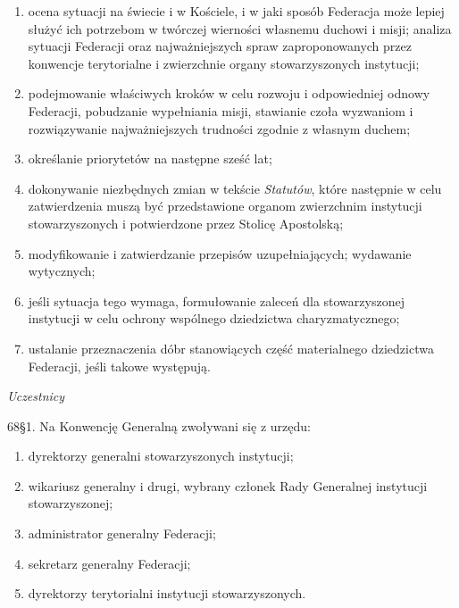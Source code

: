 ﻿\documentclass{book}
\newcommand{\lett}[1]{\lettrine[findent=6pt]{#1}}
\newcommand{\ssec}[1]{\vspace{1em}\textit{#1}\vspace{.5em}\nopagebreak}
\begin{document}
\begin{enumerate}


\item ocena sytuacji na świecie i w Kościele, i w jaki sposób Federacja może lepiej służyć ich potrzebom w twórczej wierności własnemu duchowi i misji; analiza sytuacji Federacji oraz najważniejszych spraw zaproponowanych przez konwencje terytorialne i zwierzchnie organy stowarzyszonych instytucji;


\item podejmowanie właściwych kroków w celu rozwoju i odpowiedniej odnowy Federacji, pobudzanie wypełniania misji, stawianie czoła wyzwaniom i rozwiązywanie najważniejszych trudności zgodnie z własnym duchem;


\item określanie priorytetów na następne sześć lat;


\item dokonywanie niezbędnych zmian w tekście {\em Statutów}, które następnie w celu zatwierdzenia muszą być przedstawione organom zwierzchnim instytucji stowarzyszonych i potwierdzone przez Stolicę Apostolską;


\item modyfikowanie i zatwierdzanie przepisów uzupełniających; wydawanie wytycznych;


\item jeśli sytuacja tego wymaga, formułowanie zaleceń dla stowarzyszonej instytucji  w celu ochrony wspólnego dziedzictwa charyzmatycznego;


\item ustalanie przeznaczenia dóbr stanowiących część materialnego dziedzictwa Federacji, jeśli takowe występują.  


\end{enumerate}


\ssec{Uczestnicy}


\lett{68} \S{}1. Na Konwencję Generalną zwoływani się z urzędu:


\begin{enumerate}


\item dyrektorzy generalni stowarzyszonych instytucji;


\item wikariusz generalny i drugi, wybrany członek Rady Generalnej instytucji stowarzyszonej;


\item administrator generalny Federacji;


\item sekretarz generalny Federacji;


\item dyrektorzy terytorialni instytucji stowarzyszonych.


\end{enumerate}
\end{document}
